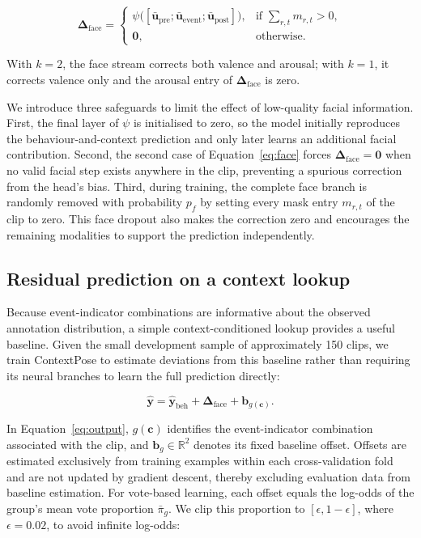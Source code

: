 \documentclass[11pt]{article}
\newcommand{\R}{\mathbb{R}}
\newcommand{\vc}{\mathbf{c}}
\newcommand{\vy}{\hat{\mathbf{y}}}
\newcommand{\vb}{\mathbf{b}}
\newcommand{\vu}{\mathbf{u}}
\begin{document}
\begin{equation}
  \bm{\Delta}_{\text{face}} =
  \begin{cases}
    \psi\big([\bar{\vu}_{\text{pre}};\bar{\vu}_{\text{event}};\bar{\vu}_{\text{post}}]\big), & \text{if } \sum_{r,t} m_{r,t}>0,\\
    \mathbf{0}, & \text{otherwise}.
  \end{cases}
  \label{eq:face}
\end{equation}

With $k=2$, the face stream corrects both valence and arousal; with $k=1$, it corrects valence only and the arousal entry of $\bm{\Delta}_{\text{face}}$ is zero.

We introduce three safeguards to limit the effect of low-quality facial information. First, the final layer of $\psi$ is initialised to zero, so the model initially reproduces the behaviour-and-context prediction and only later learns an additional facial contribution. Second, the second case of Equation~\eqref{eq:face} forces $\bm{\Delta}_{\text{face}}=\mathbf{0}$ when no valid facial step exists anywhere in the clip, preventing a spurious correction from the head's bias. Third, during training, the complete face branch is randomly removed with probability $p_f$ by setting every mask entry $m_{r,t}$ of the clip to zero. This face dropout also makes the correction zero and encourages the remaining modalities to support the prediction independently.

\subsection{Residual prediction on a context lookup}
\label{sec:residual}

Because event-indicator combinations are informative about the observed annotation distribution, a simple context-conditioned lookup provides a useful baseline. Given the small development sample of approximately 150 clips, we train ContextPose to estimate deviations from this baseline rather than requiring its neural branches to learn the full prediction directly:

\begin{equation}
  \vy = \vy_{\text{beh}} + \bm{\Delta}_{\text{face}} + \vb_{g(\vc)}.
  \label{eq:output}
\end{equation}

In Equation~\eqref{eq:output}, $g(\vc)$ identifies the event-indicator combination associated with the clip, and $\vb_{g}\in\R^2$ denotes its fixed baseline offset. Offsets are estimated exclusively from training examples within each cross-validation fold and are not updated by gradient descent, thereby excluding evaluation data from baseline estimation. For vote-based learning, each offset equals the log-odds of the group's mean vote proportion $\bar{\pi}_{g}$. We clip this proportion to $[\epsilon,1-\epsilon]$, where $\epsilon=0.02$, to avoid infinite log-odds:
\end{document}
